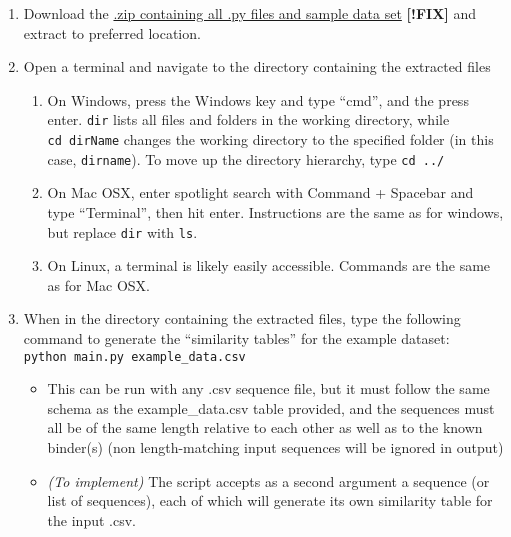 \begin{enumerate}
\def\labelenumi{\arabic{enumi}.}
\item
  Download the \href{http://google.com}{.zip containing all .py files
  and sample data set} \textbf{{[}!FIX{]}} and extract to preferred
  location.
\item
  Open a terminal and navigate to the directory containing the extracted
  files

  \begin{enumerate}
  \def\labelenumii{\arabic{enumii}.}
  \item
    On Windows, press the Windows key and type ``cmd'', and the press
    enter. \texttt{dir} lists all files and folders in the working
    directory, while \texttt{cd\ dirName} changes the working directory
    to the specified folder (in this case, \texttt{dirname}). To move up
    the directory hierarchy, type \texttt{cd\ ../}
  \item
    On Mac OSX, enter spotlight search with Command + Spacebar and type
    ``Terminal'', then hit enter. Instructions are the same as for
    windows, but replace \texttt{dir} with \texttt{ls}.
  \item
    On Linux, a terminal is likely easily accessible. Commands are the
    same as for Mac OSX.
  \end{enumerate}
\item
  When in the directory containing the extracted files, type the
  following command to generate the ``similarity tables'' for the
  example dataset: \texttt{python\ main.py\ example\_data.csv}

  \begin{itemize}
  \item
    This can be run with any .csv sequence file, but it must follow the
    same schema as the example\_data.csv table provided, and the
    sequences must all be of the same length relative to each other as
    well as to the known binder(s) (non length-matching input sequences
    will be ignored in output)
  \item
    \emph{(To implement)} The script accepts as a second argument a
    sequence (or list of sequences), each of which will generate its own
    similarity table for the input .csv.


\end{itemize}
\end{enumerate}
